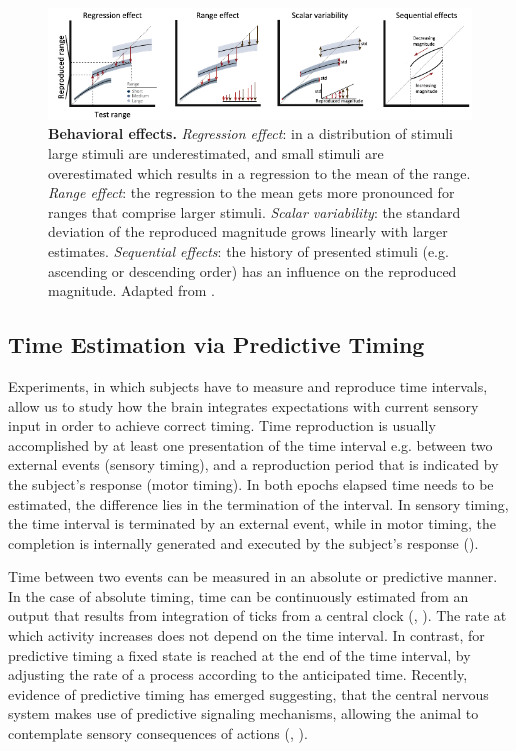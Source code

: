 \documentclass[10pt]{article}
\begin{document}
\begin{figure}[ht]
	\centering
	\includegraphics[width=\textwidth]{figures/behavioural_effects_petzschner.pdf}
	\caption{\textbf{Behavioral effects.} 
	\textit{Regression effect}: in a distribution of stimuli large stimuli are underestimated, and small stimuli are overestimated which results in a regression to the mean of the range.
	\textit{Range effect}: the regression to the mean gets more pronounced for ranges that comprise larger stimuli. 
	\textit{Scalar variability}: the standard deviation of the reproduced magnitude grows linearly with larger estimates. 
	\textit{Sequential effects}: the history of presented stimuli (e.g. ascending or descending order) has an influence on the reproduced magnitude. 
	Adapted from \cite{Petzschner2015}.}
	\label{fig:behavioraleffects}
\end{figure}

\subsection{Time Estimation via Predictive Timing}
Experiments, in which subjects have to measure and reproduce time intervals, allow us to study how the brain integrates expectations with current sensory input in order to achieve correct timing.
Time reproduction is usually accomplished by at least one presentation of the time interval e.g. between two external events (sensory timing), and a reproduction period that is indicated by the subject's response (motor timing).
In both epochs elapsed time needs to be estimated, the difference lies in the termination of the interval. In sensory timing, the time interval is terminated by an external event, while in motor timing, the completion is internally generated and executed by the subject's response (\cite{Grondin2010}).

Time between two events can be measured in an absolute or predictive manner. 
In the case of absolute timing, time can be continuously estimated from an output that results from integration of ticks from a central clock (\cite{Buhusi2005}, \cite{Paton2018}).
The rate at which activity increases does not depend on the time interval.
In contrast, for predictive timing a fixed state is reached at the end of the time interval, by adjusting the rate of a process according to the anticipated time.
Recently, evidence of predictive timing has emerged suggesting, that the central nervous system makes use of predictive signaling mechanisms, allowing the animal to contemplate sensory consequences of actions (\cite{Egger2019}, \cite{Meirhaeghe2021}).
\end{document}

